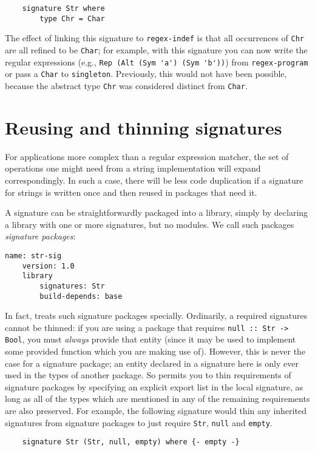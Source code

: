 \begin{lstlisting}
    signature Str where
        type Chr = Char
\end{lstlisting}

\noindent
The effect of linking this signature to \verb|regex-indef| is that
all occurrences of \verb|Chr| are all refined to be \verb|Char|;
for example, with this signature you can now write the regular
expressions (e.g., \verb|Rep (Alt (Sym 'a') (Sym 'b'))|) from
\verb|regex-program| or pass a \verb|Char| to \verb|singleton|.
Previously, this would not have been possible, because the
abstract type \verb|Chr| was considered distinct from \verb|Char|.

\section{Reusing and thinning signatures}

For applications more complex than a regular expression matcher, the set
of operations one might need from a string implementation will expand
correspondingly.  In such a case, there will be less code duplication if
a signature for strings is written once and then reused in packages that
need it.

A signature can be straightforwardly packaged into a library, simply
by declaring a library with one or more signatures, but no modules.
We call such packages \emph{signature packages}:

\begin{lstlisting}[language=Cabal]
    name: str-sig
    version: 1.0
    library
        signatures: Str
        build-depends: base
\end{lstlisting}

\noindent
In fact, \Backpack{} treats such signature packages specially.
Ordinarily, a required signatures cannot be thinned: if you are using a
package that requires \verb|null :: Str -> Bool|, you must \emph{always}
provide that entity (since it may be used to implement some provided
function which you are making use of).  However, this is never the case
for a signature package; an entity declared in a signature here is only
ever used in the types of another package.  So \Backpack{} permits you
to thin requirements of signature packages by specifying an explicit
export list in the local signature, as long as all of the types which
are mentioned in any of the remaining requirements are also preserved.
For example, the following signature would thin any inherited signatures
from signature packages to just require \verb|Str|, \verb|null| and
\verb|empty|.

\begin{lstlisting}
    signature Str (Str, null, empty) where {- empty -}
\end{lstlisting}

